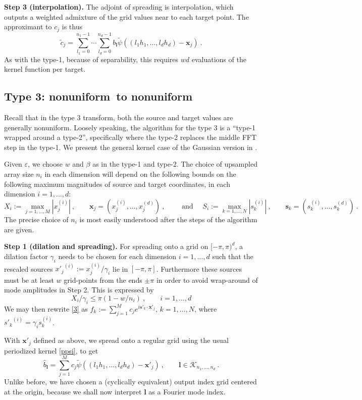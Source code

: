 \documentclass[10pt]{article}
\newcommand{\be}{\begin{equation}}
\newcommand{\ee}{\end{equation}}
\newcommand{\mbf}[1]{{\mathbf #1}}
\newcommand{\eps}{\varepsilon}
\newcommand{\xx}{\mbf{x}}
\newcommand{\sss}{\mbf{s}}
\newcommand{\KK}{{\mathcal K}}
\newcommand{\NU}{{nonuniform}}
\newcommand{\freq}{\beta}          %
\newcommand{\ppsi}{{\tilde\psi}}   %
\begin{document}
{\bf Step 3 (interpolation).}
The adjoint of spreading is interpolation, which
outputs a weighted admixture of the
grid values near to each target point.
The approximant to $c_j$ is thus
\be
\tilde c_j = \sum_{l_1=0}^{n_1-1} \cdots \sum_{l_d=0}^{n_d-1}
b_\mbf{l} \ppsi((l_1h_1,\dots,l_dh_d) - \xx_j)
~.
\label{interp}
\ee
As with the type-1,
because of separability,
this requires $wd$ evaluations of the kernel function per target.



\subsection{Type 3: \NU\ to \NU}

Recall that in the type 3 transform,
both the source and target values are generally \NU.
Loosely speaking, the algorithm for the type 3 is
a ``type-1 wrapped around a type-2'', specifically where
the type-2 replaces the middle FFT step in the type-1.
We present the general kernel case of the Gaussian version in \cite{nufft3}.

Given $\eps$, we choose $w$ and $\freq$ as in the type-1 and type-2.
The choice of upsampled array size $n_i$ in each dimension
will depend on the following bounds on
the following maximum magnitudes of source and target coordinates,
in each dimension $i=1,\dots,d$:
$$
X_i := \max_{j=1,\dots,M} |x_j^{(i)}|
~,\qquad
\xx_j = (x_j^{(i)},\dots,x_j^{(d)})
~,\qquad\mbox{ and }
\quad
S_i := \max_{k=1,\dots,N} |s_k^{(i)}|
~,\qquad
\sss_k = (s_k^{(i)},\dots,s_k^{(d)})
~.
$$
The precise choice of $n_i$ is most easily understood after the
steps of the algorithm are given.

{\bf Step 1 (dilation and spreading).}
For spreading onto a grid on $[-\pi,\pi)^d$,
a dilation factor $\gamma_i$ needs to be chosen
for each dimension $i=1,\ldots,d$ 
such that the rescaled sources ${x'_j}^{(i)} := x_j^{(i)}/\gamma_i$
lie in $[-\pi,\pi]$. Furthermore these sources must be
at least $w$ grid-points
from the ends $\pm\pi$ in order
to avoid wrap-around of mode amplitudes in Step 2.
This is expressed by
\be
X_i/\gamma_i \le \pi(1 - w/n_i)
~, \qquad i=1,\dots,d
\label{cond1}
\ee
We may then rewrite \eqref{3} as
$f_k := \sum_{j=1}^M c_j e^{i \sss'_k \cdot \xx'_j}$, $k=1,\dots, N$,
where ${s'_k}^{(i)} = \gamma_i s_k^{(i)}$.

With $\xx'_j$ defined as above,
we spread onto a regular grid using the usual
periodized kernel \eqref{ppsi}, to get
\be
\hat b_\mbf{l} = \sum_{j=1}^M c_j \ppsi((l_1h_1,\dots,l_dh_d)-\xx'_j)~,
\qquad \mbf{l} \in \KK_{n_1,\dots,n_d}~.
\label{blt3}
\ee
Unlike before, we have chosen a (cyclically equivalent) output index
grid centered at the origin, because we
shall now interpret $\mbf{l}$ as a Fourier mode index.
\end{document}

